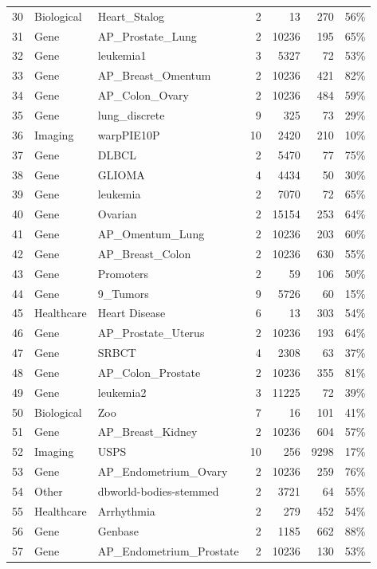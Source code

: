 \documentclass[preprint,12pt,authoryear]{elsarticle}
\begin{document}
{{{\begin{longtable}{@{}r p{1.9cm} p{6.7cm} r r r r@{}}
30 & Biological & Heart\_Stalog & 2 & 13 & 270 & 56\% \\
31 & Gene & AP\_Prostate\_Lung & 2 & 10236 & 195 & 65\% \\
32 & Gene & leukemia1 & 3 & 5327 & 72 & 53\% \\
33 & Gene & AP\_Breast\_Omentum & 2 & 10236 & 421 & 82\% \\
34 & Gene & AP\_Colon\_Ovary & 2 & 10236 & 484 & 59\% \\
35 & Gene & lung\_discrete & 9 & 325 & 73 & 29\% \\
36 & Imaging & warpPIE10P & 10 & 2420 & 210 & 10\% \\
37 & Gene & DLBCL & 2 & 5470 & 77 & 75\% \\
38 & Gene & GLIOMA & 4 & 4434 & 50 & 30\% \\
39 & Gene & leukemia & 2 & 7070 & 72 & 65\% \\
40 & Gene & Ovarian & 2 & 15154 & 253 & 64\% \\
41 & Gene & AP\_Omentum\_Lung & 2 & 10236 & 203 & 60\% \\
42 & Gene & AP\_Breast\_Colon & 2 & 10236 & 630 & 55\% \\
43 & Gene & Promoters & 2 & 59 & 106 & 50\% \\
44 & Gene & 9\_Tumors & 9 & 5726 & 60 & 15\% \\
45 & Healthcare & Heart Disease & 6 & 13 & 303 & 54\% \\
46 & Gene & AP\_Prostate\_Uterus & 2 & 10236 & 193 & 64\% \\
47 & Gene & SRBCT & 4 & 2308 & 63 & 37\% \\
48 & Gene & AP\_Colon\_Prostate & 2 & 10236 & 355 & 81\% \\
49 & Gene & leukemia2 & 3 & 11225 & 72 & 39\% \\
50 & Biological & Zoo & 7 & 16 & 101 & 41\% \\
51 & Gene & AP\_Breast\_Kidney & 2 & 10236 & 604 & 57\% \\
52 & Imaging & USPS & 10 & 256 & 9298 & 17\% \\
53 & Gene & AP\_Endometrium\_Ovary & 2 & 10236 & 259 & 76\% \\
54 & Other & dbworld-bodies-stemmed & 2 & 3721 & 64 & 55\% \\
55 & Healthcare & Arrhythmia & 2 & 279 & 452 & 54\% \\
56 & Gene & Genbase & 2 & 1185 & 662 & 88\% \\
57 & Gene & AP\_Endometrium\_Prostate & 2 & 10236 & 130 & 53\% \\

\end{longtable}}}}
\end{document}
